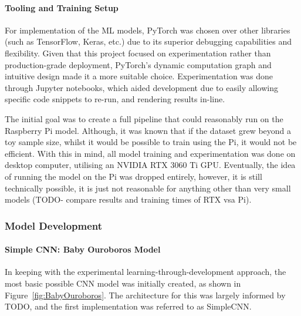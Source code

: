             \paragraph{Tooling and Training Setup}
    
            For implementation of the ML models, PyTorch was chosen over other libraries (such as TensorFlow, Keras, etc.) due to its superior debugging capabilities and flexibility. Given that this project focused on experimentation rather than production-grade deployment, PyTorch's dynamic computation graph and intuitive design made it a more suitable choice. Experimentation was done through Jupyter notebooks, which aided development due to easily allowing specific code snippets to re-run, and rendering results in-line.
    
            The initial goal was to create a full pipeline that could reasonably run on the Raspberry Pi model. Although, it was known that if the dataset grew beyond a toy sample size, whilst it would be possible to train using the Pi, it would not be efficient. With this in mind, all model training and experimentation was done on desktop computer, utilising an NVIDIA RTX 3060 Ti GPU. Eventually, the idea of running the model on the Pi was dropped entirely, however, it is still technically possible, it is just not reasonable for anything other than very small models (TODO- compare results and training times of RTX vsa Pi).
    
            \subsubsection{Model Development}
            
            \paragraph{Simple CNN: Baby Ouroboros Model}
    
                In keeping with the experimental learning-through-development approach, the most basic possible CNN model was initially created, as shown in Figure~\ref{fig:BabyOuroboros}. The architecture for this was largely informed by TODO, and the first implementation was referred to as SimpleCNN.
    
